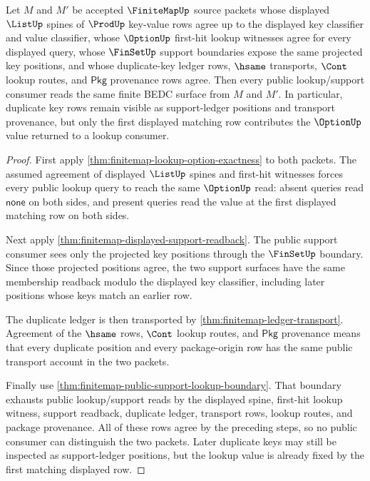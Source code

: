 \begin{theorem}
\label{thm:finitemap-support-lookup-consumer-determinacy}
Let $M$ and $M'$ be accepted $\FiniteMapUp$ source packets whose displayed
$\ListUp$ spines of $\ProdUp$ key-value rows agree up to the displayed key
classifier and value classifier, whose $\OptionUp$ first-hit lookup witnesses
agree for every displayed query, whose $\FinSetUp$ support boundaries expose the
same projected key positions, and whose duplicate-key ledger rows, $\hsame$
transports, $\Cont$ lookup routes, and $\mathsf{Pkg}$ provenance rows agree.
Then every public lookup/support consumer reads the same finite BEDC surface
from $M$ and $M'$. In particular, duplicate key rows remain visible as
support-ledger positions and transport provenance, but only the first displayed
matching row contributes the $\OptionUp$ value returned to a lookup consumer.
\end{theorem}
\begin{proof}
First apply \autoref{thm:finitemap-lookup-option-exactness} to both packets.
The assumed agreement of displayed $\ListUp$ spines and first-hit witnesses
forces every public lookup query to reach the same $\OptionUp$ read: absent
queries read $\mathsf{none}$ on both sides, and present queries read the value
at the first displayed matching row on both sides.

Next apply \autoref{thm:finitemap-displayed-support-readback}. The public
support consumer sees only the projected key positions through the
$\FinSetUp$ boundary. Since those projected positions agree, the two support
surfaces have the same membership readback modulo the displayed key classifier,
including later positions whose keys match an earlier row.

The duplicate ledger is then transported by
\autoref{thm:finitemap-ledger-transport}. Agreement of the $\hsame$ rows,
$\Cont$ lookup routes, and $\mathsf{Pkg}$ provenance means that every duplicate
position and every package-origin row has the same public transport account in
the two packets.

Finally use \autoref{thm:finitemap-public-support-lookup-boundary}. That
boundary exhausts public lookup/support reads by the displayed spine, first-hit
lookup witness, support readback, duplicate ledger, transport rows, lookup
routes, and package provenance. All of these rows agree by the preceding
steps, so no public consumer can distinguish the two packets. Later duplicate
keys may still be inspected as support-ledger positions, but the lookup value is
already fixed by the first matching displayed row.
\end{proof}

